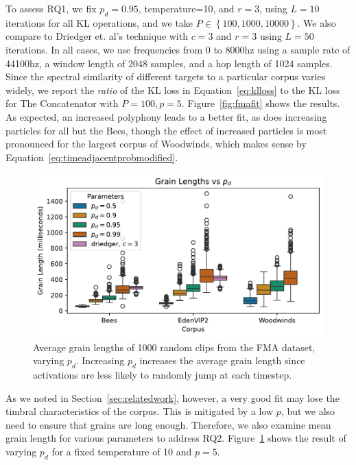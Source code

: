 \documentclass{article}
\begin{document}
To assess RQ1, we fix $p_d=0.95$, temperature=10, and $r=3$, using $L=10$ iterations for all KL operations, and we take $P \in \left\{ 100, 1000, 10000 \right\}$.  We also compare to Driedger et. al's technique with $c=3$ and $r=3$ using $L=50$ iterations.  In all cases, we use frequencies from $0$ to $8000$hz using a sample rate of 44100hz, a window length of 2048 samples, and a hop length of 1024 samples.  Since the spectral similarity of different targets to a particular corpus varies widely, we report the {\em ratio} of the KL loss in Equation~\ref{eq:klloss} to the KL loss for The Concatenator with $P=100, p=5$.  Figure~\ref{fig:fmafit} shows the results.  As expected, an increased polyphony leads to a better fit, as does increasing particles for all but the Bees, though the effect of increased particles is most pronounced for the largest corpus of Woodwinds, which makes sense by Equation~\ref{eq:timeadjacentprobmodified}.


\begin{figure}
    \centering
    \includegraphics[width=\columnwidth]{figs/pdGrainLengths.pdf}
    \caption{Average grain lengths of 1000 random clips from the FMA dataset, varying $p_d$.  Increasing $p_d$ increases the average grain length since activations are less likely to randomly jump at each timestep.}
    \label{fig:pdGrainLengths}
\end{figure}

As we noted in Section~\ref{sec:relatedwork}, however, a very good fit may lose the timbral characteristics of the corpus.  This is mitigated by a low $p$, but we also need to ensure that grains are long enough.  Therefore, we also examine mean grain length for various parameters to address RQ2.  Figure~\ref{fig:pdGrainLengths} shows the result of varying $p_d$ for a fixed temperature of 10 and $p=5$.
\end{document}
